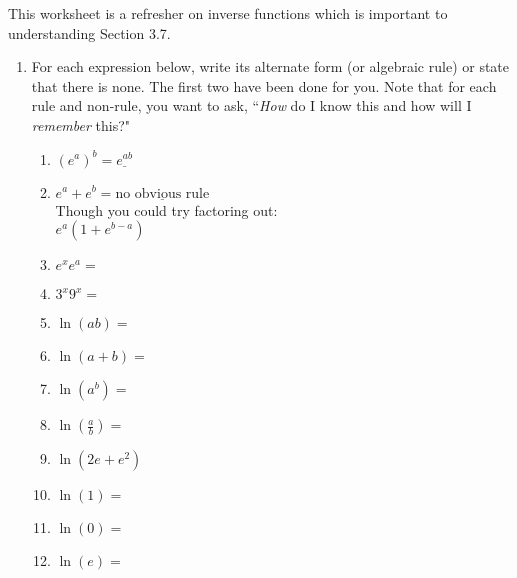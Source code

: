 \documentclass[11pt,fleqn]{article}
\begin{document}
\renewcommand{\headrulewidth}{0pt}
\newcommand{\blank}[1]{\rule{#1}{0.75pt}}
\newcommand{\bc}{\begin{center}}
\newcommand{\ec}{\end{center}}
\renewcommand{\d}{\displaystyle}



\begin{center}
  \large
\end{center}
 This worksheet is a refresher on inverse functions which is important to understanding Section 3.7. \\ 
 \begin{enumerate}
 	\item For each expression below, write its alternate form (or algebraic rule) or state that there is none. The first two have been done for you. Note that for each rule and non-rule, you want to ask, ``\emph{How} do I know this and how will I \emph{remember} this?"
	\begin{multicols}{2}
		\begin{enumerate}
		 \item $(e^{a})^b=\underline{e^{ab}}$\\
		 \item $e^a+e^b=\underline{\text{no obvious rule}}$ \\ Though you could try factoring out: \\$e^a(1+e^{b-a})$ \\
		 \item $e^xe^a=$\\
		 \item $3^x9^x=$\\
		 \item $\ln(ab)=$\\
		 \item $\ln(a+b)=$\\
		 \item $\ln(a^b)=$\\
		 \item $\ln(\frac{a}{b})=$\\
		 \item $\ln(2e+e^2)$\\
		 \item $\ln(1)=$\\
		 \item $\ln(0)=$\\
		 \item $\ln(e)=$\\

\end{enumerate}
\end{multicols}
\end{enumerate}
\end{document}
